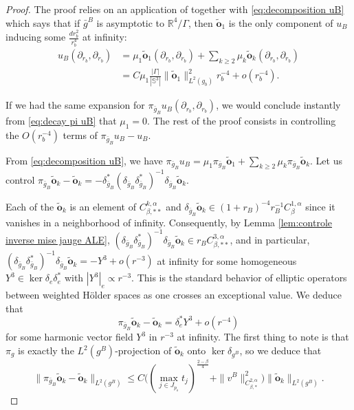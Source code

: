 \documentclass[11pt,reqno]{amsart}
\numberwithin{equation}{section}
\theoremstyle{definition}
\theoremstyle{remark}
\begin{document}
\begin{proof}
The proof relies on an application of \cite[Lemma 11.16]{do3} together with \eqref{eq:decomposition uB} which says that if $\bar{g}^B$ is asymptotic to $\mathbb{R}^4/\Gamma$, then $\tilde{\mathbf{o}}_1$ is the only component of $u_B$ inducing some $\frac{dr_b^2}{r_b^4}$ at infinity:
\begin{equation}\label{eq: asympt uB}
    \begin{aligned}
        u_B(\partial_{r_b},\partial_{r_b}) &= \mu_1\tilde{\mathbf{o}}_1(\partial_{r_b},\partial_{r_b}) + \sum_{k\geqslant 2}\mu_k \tilde{\mathbf{o}}_k(\partial_{r_b},\partial_{r_b}) \\
        &= C \mu_1 \frac{|\Gamma|}{|\mathbb{S}^3|} \|\tilde{\mathbf{o}}_1\|^2_{L^2(g_b)} r_b^{-4}+o(r_b^{-4}).
    \end{aligned}
\end{equation} 

 If we had the same expansion for $\pi_{\bar{g}_B}u_B(\partial_{r_b},\partial_{r_b})$, we would conclude instantly from \eqref{eq:decay pi uB} that $\mu_1 = 0$. The rest of the proof consists in controlling the $O(r_b^{-4})$ terms of $\pi_{\bar{g}_B}u_B-u_B$.

From \eqref{eq:decomposition uB}, we have
$\pi_{\bar{g}_B}u_B = \mu_1\pi_{\bar{g}_B}\tilde{\mathbf{o}}_1 + \sum_{k\geqslant 2}\mu_k \pi_{\bar{g}_B}\tilde{\mathbf{o}}_k$. Let us control $\pi_{\bar{g}_B}\tilde{\mathbf{o}}_k-\tilde{\mathbf{o}}_k = -\delta^*_{\bar{g}_B}(\delta_{\bar{g}_B}\delta^*_{\bar{g}_B})^{-1}\delta_{\bar{g}_B}\tilde{\mathbf{o}}_k$.

Each of the $\tilde{\mathbf{o}}_k$ is an element of $C^{k,\alpha}_{\beta,**}$ and $\delta_{\bar{g}_B}\tilde{\mathbf{o}}_k\in (1+r_B)^{-4}r_B^{-1}C^{1,\alpha}_\beta$ since it vanishes in a neighborhood of infinity. Consequently, by Lemma \ref{lem:controle inverse mise jauge ALE}, $(\delta_{\bar{g}_B}\delta^*_{\bar{g}_B})^{-1}\delta_{\bar{g}_B}\tilde{\mathbf{o}}_k\in r_BC^{3,\alpha}_{\beta,**}$, and in particular, $(\delta_{\bar{g}_B}\delta^*_{\bar{g}_B})^{-1}\delta_{\bar{g}_B}\tilde{\mathbf{o}}_k = -Y^3+o(r^{-3})$ at infinity for some homogeneous $Y^3\in\ker \delta_e\delta^*_e$ with $|Y^3|_e\propto r^{-3}$. This is the standard behavior of elliptic operators between weighted Hölder spaces as one crosses an exceptional value. We deduce that
\begin{equation}\label{eq:exp pi ok}
    \pi_{\bar{g}_B}\tilde{\mathbf{o}}_k-\tilde{\mathbf{o}}_k = \delta_{e}^*Y^3 + o(r^{-4})
\end{equation} 
for some harmonic vector field $Y^3$ in $r^{-3}$ at infinity. The first thing to note is that $\pi_g$ is exactly the $L^2(g^B)$-projection of $\tilde{\mathbf{o}}_k$ onto $\ker \delta_{g^B}$, so we deduce that 
$$\|\pi_{\bar{g}_B}\tilde{\mathbf{o}}_k-\tilde{\mathbf{o}}_k\|_{L^2(g^B)} \leqslant C \Big((\max_{j\in J_{p_o}} t_{j})^{\frac{2-\beta}4} + \|v ^B\|_{C^{2,\alpha}_{\beta,*}}^2\Big) \|\tilde{\mathbf{o}}_k\|_{L^2(g^B)}.$$


\end{proof}
\end{document}
